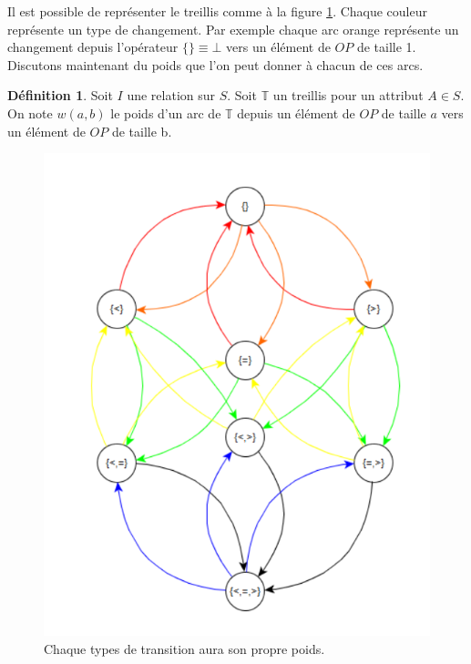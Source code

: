 \documentclass[letterpaper, 12pt]{report}
\theoremstyle{definition}
\newtheorem{mydef}{Définition}
\begin{document}
Il est possible de représenter le treillis comme à la figure \ref{treillisGraph}. Chaque couleur représente un type de changement. Par exemple chaque arc orange représente un changement depuis l'opérateur $\{ \} \equiv \bot$ vers un élément de $OP$ de taille 1. Discutons maintenant du poids que l'on peut donner à chacun de ces arcs.

\begin{mydef}

	Soit $I$ une relation sur $S$. Soit $\mathbb{T}$ un treillis pour un attribut $A \in S$. On note $w(a,b)$ le poids d'un arc de $\mathbb{T}$ depuis un élément de $OP$ de taille $a$ vers un élément de $OP$ de taille b.

\end{mydef}


\begin{figure}
	\centering
	\includegraphics[scale=0.655]{img/treillisGraph}
	\caption{\label{treillisGraph} Chaque types de transition aura son propre poids.}
\end{figure}
\end{document}
